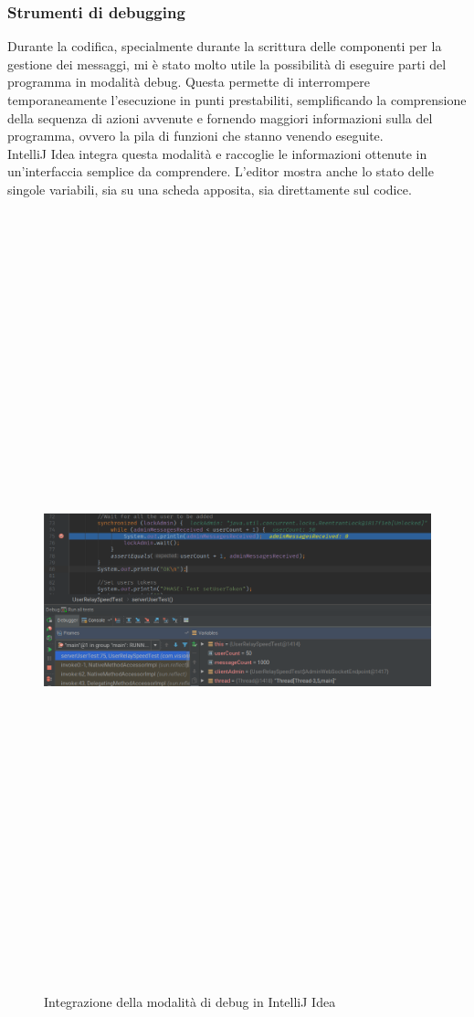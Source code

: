 		\subsubsection{Strumenti di debugging}
		Durante la codifica, specialmente durante la scrittura delle componenti per la gestione dei messaggi, mi è stato molto utile la possibilità di eseguire parti del programma in modalità debug. Questa permette di interrompere temporaneamente l'esecuzione in punti prestabiliti, semplificando la comprensione della sequenza di azioni avvenute e fornendo maggiori informazioni sulla  del programma, ovvero la pila di funzioni che stanno venendo eseguite.
		\\
		IntelliJ Idea integra questa modalità e raccoglie le informazioni ottenute in un'interfaccia semplice da comprendere. L'editor mostra anche lo stato delle singole variabili, sia su una scheda apposita, sia direttamente sul codice. 
		\begin{figure}[H]
			\begin{center}
				\includegraphics[width=16.5cm,height=22.5cm,keepaspectratio]{immagini/intellij-debugger}
				\caption{Integrazione della modalità di debug in IntelliJ Idea}
			\end{center}
		\end{figure}

